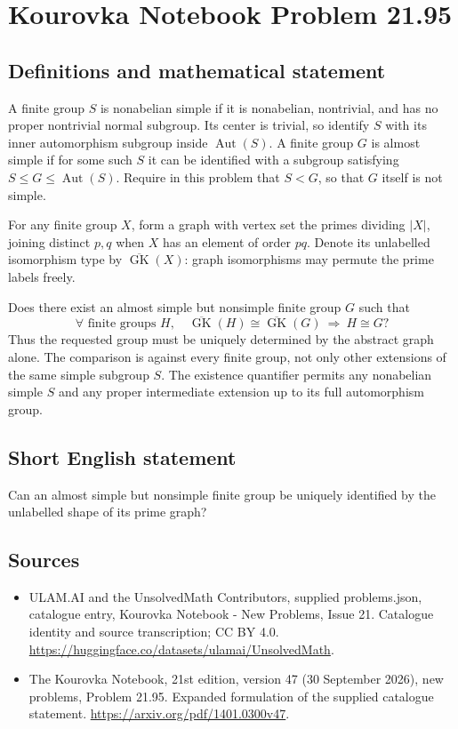 \documentclass[11pt,a4paper]{article}
\begin{document}
\section*{Kourovka Notebook Problem 21.95}\label{statement}

\subsection{Definitions and mathematical statement}
A finite group $S$ is nonabelian simple if it is nonabelian, nontrivial, and has no proper nontrivial normal subgroup. Its center is trivial, so identify $S$ with its inner automorphism subgroup inside $\operatorname{Aut}(S)$. A finite group $G$ is almost simple if for some such $S$ it can be identified with a subgroup satisfying $S\le G\le\operatorname{Aut}(S)$. Require in this problem that $S<G$, so that $G$ itself is not simple.

For any finite group $X$, form a graph with vertex set the primes dividing $|X|$, joining distinct $p,q$ when $X$ has an element of order $pq$. Denote its unlabelled isomorphism type by $\overline{\operatorname{GK}}(X)$: graph isomorphisms may permute the prime labels freely.

Does there exist an almost simple but nonsimple finite group $G$ such that
\[
 \forall\text{ finite groups }H,\quad
 \overline{\operatorname{GK}}(H)\cong
 \overline{\operatorname{GK}}(G)\ \Longrightarrow\ H\cong G?
\]
Thus the requested group must be uniquely determined by the abstract graph alone. The comparison is against every finite group, not only other extensions of the same simple subgroup $S$. The existence quantifier permits any nonabelian simple $S$ and any proper intermediate extension up to its full automorphism group.
\subsection{Short English statement}
Can an almost simple but nonsimple finite group be uniquely identified by the unlabelled shape of its prime graph?
\subsection{Sources}
\begin{itemize}
\item[S1] ULAM.AI and the UnsolvedMath Contributors, supplied problems.json, catalogue entry, Kourovka Notebook - New Problems, Issue 21. Catalogue identity and source transcription; CC BY 4.0.
\url{https://huggingface.co/datasets/ulamai/UnsolvedMath}.
\item[S2] The Kourovka Notebook, 21st edition, version 47 (30 September 2026), new problems, Problem 21.95. Expanded formulation of the supplied catalogue statement.
\url{https://arxiv.org/pdf/1401.0300v47}.
\end{itemize}
\end{document}

